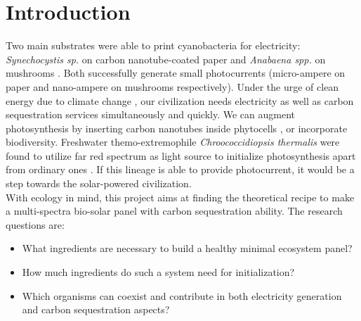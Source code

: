 \documentclass[a4paper, 11pt]{article}
\begin{document}
\section{Introduction}
Two main substrates were able to print cyanobacteria for electricity:  \textit{Synechocystis sp.} on carbon nanotube-coated paper \autocite{sawa2017electricity} and \textit{Anabaena spp.} on mushrooms \autocite{joshi2018bacterial}.  Both successfully generate small photocurrents (micro-ampere on paper \autocite{sawa2017electricity} and nano-ampere on mushrooms \autocite{joshi2018bacterial} respectively).  Under the urge of clean energy due to climate change \autocite{schuur2015climate}, our civilization needs electricity as well as carbon sequestration services simultaneously and quickly.  We can augment photosynthesis by inserting carbon nanotubes inside phytocells \autocite{giraldo2014plant}, or incorporate biodiversity.  Freshwater themo-extremophile \textit{Chroococcidiopsis thermalis} were found to utilize far red spectrum as light source to initialize photosynthesis apart from ordinary ones \autocite{nurnberg2018photochemistry}.  If this lineage is able to provide photocurrent, it would be a step towards the solar-powered civilization.\\

With ecology in mind, this project aims at finding the theoretical recipe to make a multi-spectra bio-solar panel with carbon sequestration ability.  The research questions are:

\begin{itemize}
	\item What ingredients are necessary to build a healthy minimal ecosystem panel?
	\item How much ingredients do such a system need for initialization?
	\item Which organisms can coexist and contribute in both electricity generation and carbon sequestration aspects?
\end{itemize}
\end{document}
